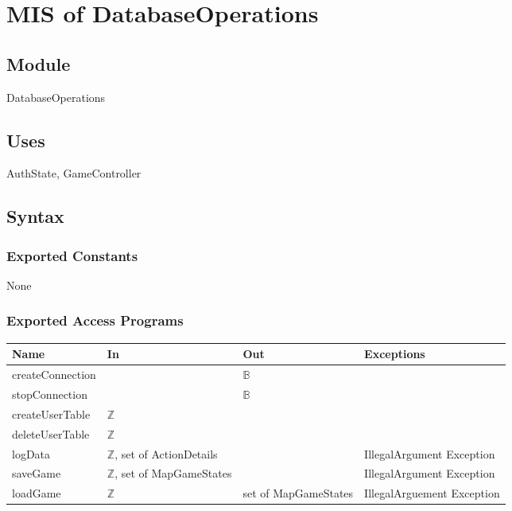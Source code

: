 \documentclass[12pt, titlepage]{article}
\begin{document}
\medskip
\newpage
\section{MIS of DatabaseOperations} 


\subsection{Module}
DatabaseOperations

\subsection{Uses}
AuthState, GameController

\subsection{Syntax}

\subsubsection{Exported Constants}
None

\subsubsection{Exported Access Programs}

\begin{center}
\begin{tabular}{p{4cm} p{4cm} p{4cm} p{2cm}}
\hline
\textbf{Name} & \textbf{In} & \textbf{Out} & \textbf{Exceptions} \\
\hline
createConnection &   & $\mathbb{B}$ & \\
\hline
stopConnection &   & $\mathbb{B}$ & \\
\hline
createUserTable & $\mathbb{Z}$ &  &  \\
\hline
deleteUserTable & $\mathbb{Z}$ &  &  \\
\hline
logData & $\mathbb{Z}$, set of ActionDetails  &  & IllegalArgument
Exception\\
\hline
saveGame & $\mathbb{Z}$, set of MapGameStates &  & IllegalArgument Exception \\
\hline
loadGame & $\mathbb{Z}$ & set of MapGameStates & IllegalArguement
Exception \\
\hline
\end{tabular}
\end{center}
\end{document}
